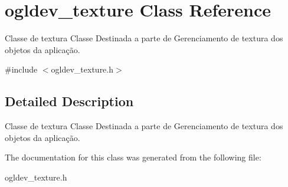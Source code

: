 \hypertarget{classogldev__texture}{\section{ogldev\-\_\-texture Class Reference}
\label{classogldev__texture}
}


Classe de textura Classe Destinada a parte de Gerenciamento de textura dos objetos da aplicação.  




{\ttfamily \#include $<$ogldev\-\_\-texture.\-h$>$}



\subsection{Detailed Description}
Classe de textura Classe Destinada a parte de Gerenciamento de textura dos objetos da aplicação. 

The documentation for this class was generated from the following file\-:\begin{DoxyCompactItemize}
\item 
ogldev\-\_\-texture.\-h\end{DoxyCompactItemize}
